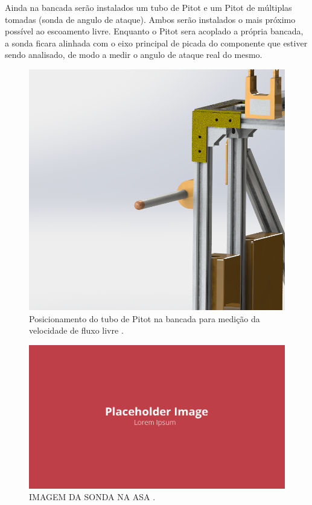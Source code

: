 Ainda na bancada serão instalados um tubo de Pitot e um Pitot de múltiplas tomadas (sonda de angulo de ataque). Ambos serão instalados o mais próximo possível ao escoamento livre. Enquanto o Pitot sera acoplado a própria bancada, a sonda ficara alinhada com o eixo principal de picada do componente que estiver sendo analisado, de modo a medir o angulo de ataque real do mesmo. 

\begin{figure}[!ht]
    \centering
    \includegraphics[width=.8\linewidth]{figuras/renders/detalhe_pitot_bancada.png}
    \caption{Posicionamento do tubo de Pitot na bancada para medição da velocidade de fluxo livre \cite{autor}.}
    \label{fig:placeholder}
\end{figure}

\begin{figure}[!ht]
    \centering
    \includegraphics[width=.8\linewidth]{figuras/outras/placeholder.png}
    \caption{IMAGEM DA SONDA NA ASA \cite{autor}.}
    \label{fig:placeholder}
\end{figure}

